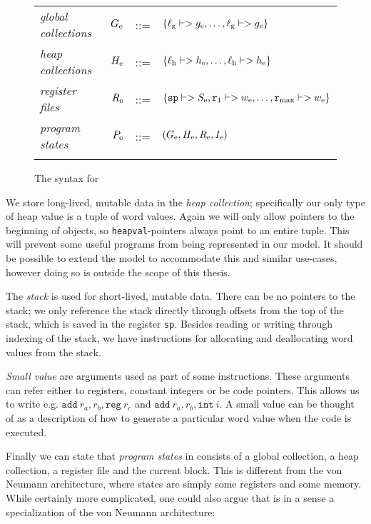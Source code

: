 \begin{figure}
{\begin{tabular}{lrcl}
      \textit{global collections} & $G_{\mathrm{e}}$ & ::= & $\{\ell_{\mathrm{g}} |-> g_{\mathrm{e}}, \dots, \ell_{\mathrm{g}} |-> g_{\mathrm{e}}\}$ \\
      \textit{heap collections}   & $H_{\mathrm{e}}$ & ::= & $\{\ell_{\mathrm{h}} |-> h_{\mathrm{e}}, \dots, \ell_{\mathrm{h}} |-> h_{\mathrm{e}}\}$ \\
      \textit{register files}     & $R_{\mathrm{e}}$ & ::= & $\{\mathtt{sp} |-> S_{\mathrm{e}}, \mathtt{r}_1 |-> w_{\mathrm{e}}, \dots, \mathtt{r}_{\mathrm{max}} |-> w_{\mathrm{e}}\}$ \\
      \textit{program states} & $P_{\mathrm{e}}$ & ::= & $(G_{\mathrm{e}}, H_{\mathrm{e}}, R_{\mathrm{e}}, I_{\mathrm{e}})$ \\\\
    \end{tabular}
  }
  \caption{The syntax for \ATALe}
  \label{fig:esyntax}
\end{figure}

We store long-lived, mutable data in the \emph{heap collection}; specifically
our only type of heap value is a tuple of word values. Again we will only allow
pointers to the beginning of objects, so \texttt{heapval}-pointers always point
to an entire tuple. This will prevent some useful programs from being
represented in our model. It should be possible to extend the model to
accommodate this and similar use-cases, however doing so is outside the scope of
this thesis.

The \emph{stack} is used for short-lived, mutable data. There can be no pointers
to the stack; we only reference the stack directly through offsets from the top
of the stack, which is saved in the register \texttt{sp}. Besides reading or
writing through indexing of the stack, we have instructions for allocating and
deallocating word values from the stack.

\emph{Small value} are arguments used as part of some instructions. These
arguments can refer either to registers, constant integers or be code
pointers. This allows us to write e.g.
$\mathtt{add}\ r_a, r_b, \mathtt{reg}\ r_c$ and
$\mathtt{add}\ r_a, r_b, \mathtt{int}\ i$. A small value can be thought of as a
description of how to generate a particular word value when the code is
executed.

Finally we can state that \emph{program states} in \ATALe consists of a global
collection, a heap collection, a register file and the current block. This is
different from the von Neumann architecture, where states are simply some
registers and some memory. While certainly more complicated, one could also
argue that \ATALe is in a sense a specialization of the von Neumann
architecture:


